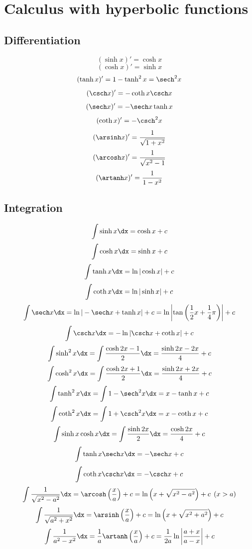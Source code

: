 \section{Calculus with hyperbolic functions}
\subsection{Differentiation}
\[(\sinh x)'=\cosh x\]
\[(\cosh x)'=\sinh x\]
\[(\tanh x)'=1-\tanh^2 x = \sech^2 x\]
\[(\csch x)'=-\coth x \csch x\]
\[(\sech x)'=-\sech x \tanh x\]
\[(\coth x)'=-\csch^2 x\]
\[(\arsinh x)' = \frac{1}{\sqrt{1+x^2}}\]
\[(\arcosh x)' = \frac{1}{\sqrt{x^2-1}}\]
\[(\artanh x)' = \frac{1}{1-x^2}\]


\subsection{Integration}
\[\int\sinh x \dx = \cosh x + c\]
\[\int\cosh x \dx = \sinh x + c\]
\[\int \tanh x \dx = \ln |\cosh x| + c\]
\[\int \coth x \dx = \ln |\sinh x| + c\]
\[\int \sech x \dx = \ln |-\sech x + \tanh x| + c = \ln \left|\tan\left(\frac{1}{2}x+\frac{1}{4}\pi \right)\right| + c\]
\[\int \csch x \dx = -\ln|\csch x + \coth x| + c\]
\[\int \sinh^2 x \dx = \int \frac{\cosh 2x - 1}{2} \dx = \frac{\sinh 2x - 2x}{4} + c\]
\[\int \cosh^2 x \dx = \int \frac{\cosh 2x + 1}{2} \dx = \frac{\sinh 2x + 2x}{4} + c\]
\[\int \tanh^2 x \dx = \int 1-\sech^2 x \dx = x - \tanh x + c\]
\[\int \coth^2 x \dx = \int 1+\csch^2 x \dx = x - \coth x + c\]
\[\int \sinh x \cosh x \dx = \int \frac{\sinh 2x}{2} \dx = \frac{\cosh 2x}{4} + c\]
\[\int \tanh x \sech x \dx = -\sech x + c\]
\[\int \coth x \csch x \dx = -\csch x + c\]
\[\int \frac{1}{\sqrt{x^2-a^2}} \dx= \arcosh \left(\frac{x}{a}\right) + c = \ln \left(x + \sqrt{x^2-a^2}\right) + c \:\:  (x>a)\]
\[\int \frac{1}{\sqrt{a^2+x^2}} \dx= \arsinh \left(\frac{x}{a}\right) + c = \ln \left(x + \sqrt{x^2+a^2}\right) + c \]
\[\int \frac{1}{a^2-x^2} \dx=\frac{1}{a}\artanh \left(\frac{x}{a}\right) + c = \frac{1}{2a}\ln \left|\frac{a+x}{a-x}\right| + c\]

